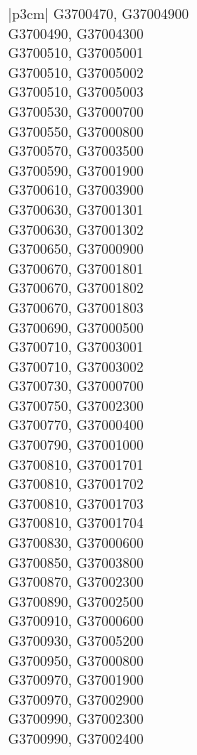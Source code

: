 \begin{customLongTable}{ |p{3cm}| }
G3700470, G37004900 \\ \hline
G3700490, G37004300 \\ \hline
G3700510, G37005001 \\ \hline
G3700510, G37005002 \\ \hline
G3700510, G37005003 \\ \hline
G3700530, G37000700 \\ \hline
G3700550, G37000800 \\ \hline
G3700570, G37003500 \\ \hline
G3700590, G37001900 \\ \hline
G3700610, G37003900 \\ \hline
G3700630, G37001301 \\ \hline
G3700630, G37001302 \\ \hline
G3700650, G37000900 \\ \hline
G3700670, G37001801 \\ \hline
G3700670, G37001802 \\ \hline
G3700670, G37001803 \\ \hline
G3700690, G37000500 \\ \hline
G3700710, G37003001 \\ \hline
G3700710, G37003002 \\ \hline
G3700730, G37000700 \\ \hline
G3700750, G37002300 \\ \hline
G3700770, G37000400 \\ \hline
G3700790, G37001000 \\ \hline
G3700810, G37001701 \\ \hline
G3700810, G37001702 \\ \hline
G3700810, G37001703 \\ \hline
G3700810, G37001704 \\ \hline
G3700830, G37000600 \\ \hline
G3700850, G37003800 \\ \hline
G3700870, G37002300 \\ \hline
G3700890, G37002500 \\ \hline
G3700910, G37000600 \\ \hline
G3700930, G37005200 \\ \hline
G3700950, G37000800 \\ \hline
G3700970, G37001900 \\ \hline
G3700970, G37002900 \\ \hline
G3700990, G37002300 \\ \hline
G3700990, G37002400 \\ \hline

\end{customLongTable}
